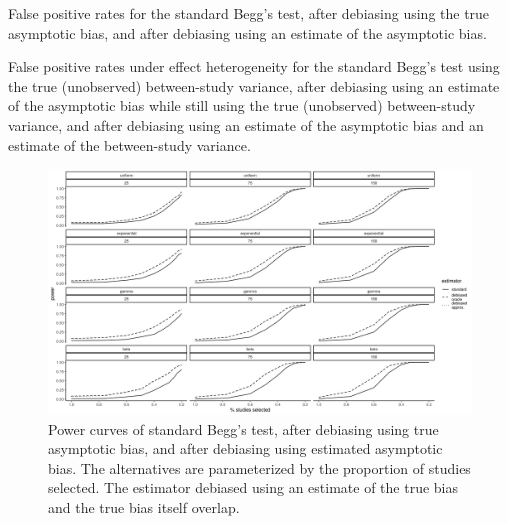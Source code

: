 \documentclass[12pt]{article}
\newcommand{\comment}[1]{
  \iftoggle{commenttoggle}{
    {\normalsize{\color{red}{ #1}}\normalsize}
  }
  {}
}
\begin{document}
\begin{table}
  
  \caption{False positive rates for the standard Begg's test, after debiasing using the true asymptotic bias, and after debiasing using an estimate of the asymptotic bias.}
  \label{table:fpr}
\end{table}

\begin{table}
  
  \caption{False positive rates under effect heterogeneity for the standard Begg's test using the true (unobserved) between-study variance, after debiasing using an estimate of the asymptotic bias while still using the true (unobserved) between-study variance, and after debiasing using an estimate of the asymptotic bias and an estimate of the between-study variance.}
  \label{table:fpr_hetero}
\end{table}


\begin{figure}
  \includegraphics[width=\linewidth]{power_curves.png}
  \caption{Power curves of standard Begg's test, after debiasing using true asymptotic bias, and after debiasing using estimated asymptotic bias. The alternatives are parameterized by the proportion of studies selected. The estimator debiased using an estimate of the true bias and the true bias itself overlap.\comment{increase size of plot}}
  \label{fig:power}
\end{figure}
\end{document}
